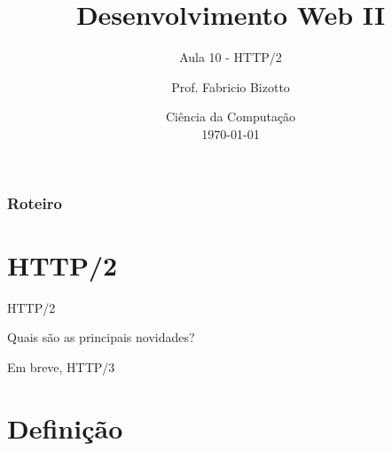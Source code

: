 \documentclass[
	9pt, %
	t, %
]{beamer}
\title[DesWebII]{Desenvolvimento Web II} %
\subtitle{Aula 10 - HTTP/2} %
\author[Fabricio Bizotto]{Prof. Fabricio Bizotto} %
\institute[IFC]{Instituto Federal Catarinense \\ \smallskip \textit{fabricio.bizotto@ifc.edu.br}} %
\date[\today]{Ciência da Computação \\ \today} %
\begin{document}

\begin{frame}
	\titlepage %
\end{frame}


\begin{frame}
	\frametitle{Roteiro} %
	
	\tableofcontents %
\end{frame}


\section{HTTP/2}

\begin{frame}
	\begin{center}
		
		\bigskip\bigskip\bigskip\bigskip %
		{\Large HTTP/2}
		
		\bigskip\bigskip %
		{\Huge Quais são as principais novidades?}

		\bigskip\bigskip %
		{\small Em breve, HTTP/3}
	\end{center}

\end{frame}

\section{Definição}
\end{document}
